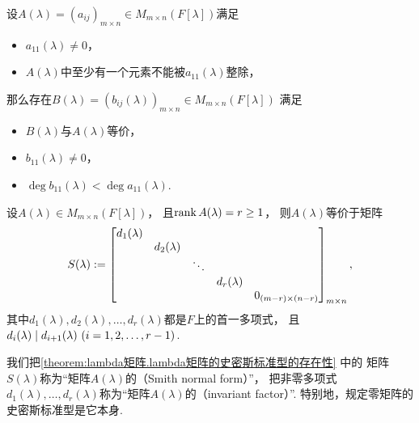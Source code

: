 \begin{lemma}
设\(A(\lambda) = (a_{ij})_{m \times n} \in M_{m \times n}(F[\lambda])\)满足\begin{itemize}
	\item \(a_{11}(\lambda) \neq 0\)，
	\item \(A(\lambda)\)中至少有一个元素不能被\(a_{11}(\lambda)\)整除，
\end{itemize}
那么存在\(B(\lambda) = (b_{ij}(\lambda))_{m \times n} \in M_{m \times n}(F[\lambda])\)
满足\begin{itemize}
	\item \(B(\lambda)\)与\(A(\lambda)\)等价，
	\item \(b_{11}(\lambda) \neq 0\)，
	\item \(\deg b_{11}(\lambda) < \deg a_{11}(\lambda)\).
\end{itemize}
\end{lemma}

\begin{theorem}\label{theorem:lambda矩阵.lambda矩阵的史密斯标准型的存在性}
设\(A(\lambda) \in M_{m \times n}(F[\lambda])\)，
且\(\rank A(\lambda) = r \geq 1\)，
则\(A(\lambda)\)等价于矩阵\begin{equation*}
	S(\lambda)
	:=
	\begin{bmatrix}
		d_1(\lambda) \\
		& d_2(\lambda) \\
		&& \ddots \\
		&&& d_r(\lambda) \\
		&&&& 0_{(m-r) \times (n-r)} \\
	\end{bmatrix}_{m \times n},
\end{equation*}
其中\(d_1(\lambda),d_2(\lambda),\dotsc,d_r(\lambda)\)都是\(F\)上的首一多项式，
且\(
	\ExactlyDividedBy{ d_{i+1}(\lambda) }{ d_i(\lambda) }  %
	\ (i=1,2,\dotsc,r-1)
\).
\end{theorem}

\begin{definition}
我们把\cref{theorem:lambda矩阵.lambda矩阵的史密斯标准型的存在性} 中的
矩阵\(S(\lambda)\)称为“矩阵\(A(\lambda)\)的（Smith normal form）”，
把非零多项式\(d_1(\lambda),\dotsc,d_r(\lambda)\)称为“矩阵\(A(\lambda)\)的（invariant factor）”.
特别地，规定零矩阵的史密斯标准型是它本身.
\end{definition}

